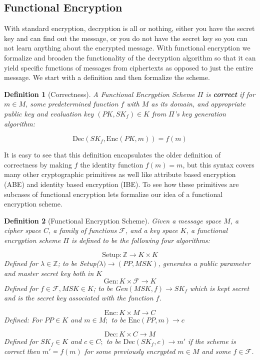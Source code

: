 \documentclass[12pt,twoside]{reedthesis}
\newtheorem{definition}{Definition}
\newcommand{\enc}[0]{\text{Enc}}
\newcommand{\dec}[0]{\text{Dec}}
\newcommand{\Z}[0]{\mathbb{Z}}
\begin{document}
\subsection{Functional Encryption}

With standard encryption, decryption is all or nothing, either you have the secret key and can find out the message, or you do not have the secret key so you can not learn anything about the encrypted message. With functional encryption we formalize and broaden the functionality of the decryption algorithm so that it can yield specific functions of messages from ciphertexts as opposed to just the entire message. We start with a definition and then formalize the scheme.
\begin{definition}[Correctness]
A Functional Encryption Scheme $\Pi$ is \textbf{correct} if for $m \in M$, some predetermined function $f$ with $M$ as its domain, and appropriate public key and \textit{evaluation} key $(PK,SK_f)\in K$ from $\Pi$'s key generation algorithm:

$$\dec(SK_f, \enc(PK,m)) = f(m) $$
\end{definition}

It is easy to see that this definition encapsulates the older definition of correctness by making $f$ the identity function $f(m) = m$, but this syntax covers many other cryptographic primitives as well like attribute based encryption (ABE) and identity based encryption (IBE). To see how these primitives are subcases of functional encryption lets formalize our idea of a functional encryption scheme. 




\begin{definition}[Functional Encryption Scheme]
Given a message space $M$, a cipher space $C$, a family of functions $\mathcal{F}$, and a key space $K$, a functional encryption scheme $\Pi$ is defined to be the following four algorithms:

$$\text{Setup}: \Z \rightarrow K \times K$$
Defined for $\lambda \in \Z$; to be Setup($\lambda) \rightarrow (PP,MSK)$, generates a public parameter and master secret key both in $K$
$$\text{Gen}: K \times \mathcal{F} \rightarrow K $$
Defined for $f \in \mathcal{F}, MSK \in K$; to be Gen$(MSK,f) \rightarrow SK_f$ which is kept secret and is the secret key associated with the function $f$.

$$\enc: K \times M \rightarrow C$$
Defined: For $PP\in K$ and $m \in M;$ to be $\enc(PP,m) \rightarrow c$

$$\dec:K \times C \rightarrow M$$
Defined for $SK_f \in K$ and $c \in C;$ to be $\dec(SK_f,c) \rightarrow m'$ if the scheme is correct then $m' = f(m)$ for some previously encrypted $m\in M$ and some $f\in \mathcal{F}$.

\end{definition}
\end{document}
